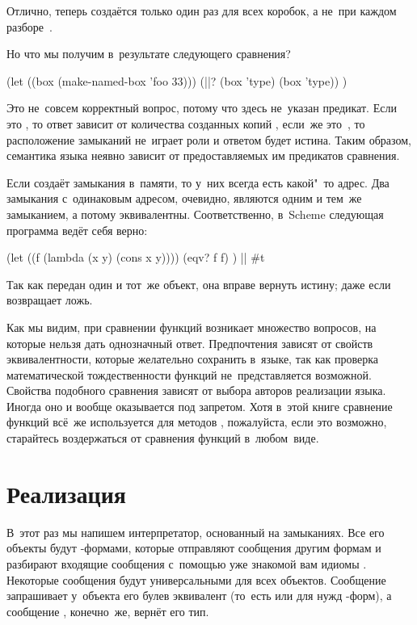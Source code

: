 \noindent
Отлично,  теперь создаётся только один раз для всех коробок, а
не~при каждом разборе~.

Но что мы получим в~результате следующего сравнения?

\begin{code:lisp}
(let ((box (make-named-box 'foo 33)))
  (||? (box 'type) (box 'type)) )
\end{code:lisp}

Это не~совсем корректный вопрос, потому что здесь не~указан предикат. Если это
, то ответ зависит от количества созданных копий , если~же это~, то расположение замыканий не~играет роли и
ответом будет истина. Таким образом, семантика языка неявно зависит от
предоставляемых им предикатов сравнения.

Если  создаёт замыкания в~памяти, то у~них всегда есть какой"~то
адрес. Два замыкания с~одинаковым адресом, очевидно, являются одним и тем~же
замыканием, а потому эквивалентны. Соответственно, в~Scheme следующая программа
ведёт себя верно:

\begin{code:lisp}
(let ((f (lambda (x y) (cons x y))))
  (eqv? f f) ) |\is| #t
\end{code:lisp}

\noindent
Так как  передан один и тот~же объект, она вправе вернуть истину; даже
если  возвращает ложь.

\bigskip

Как мы видим, при сравнении функций возникает множество вопросов, на которые
нельзя дать однозначный ответ. Предпочтения зависят от свойств эквивалентности,
которые желательно сохранить в~языке, так как проверка математической
тождественности функций не~представляется возможной. Свойства подобного
сравнения зависят от выбора авторов реализации языка. Иногда оно и вообще
оказывается под запретом. Хотя в~этой книге сравнение функций всё~же
используется для методов {\Meroonet} ,
пожалуйста, если это возможно, старайтесь воздержаться от сравнения функций
в~любом~виде.


\section{Реализация}\label{assignment/sect:implementation}

В~этот раз мы напишем интерпретатор, основанный на замыканиях. Все его объекты
будут -формами, которые отправляют сообщения другим формам и
разбирают входящие сообщения с~помощью уже знакомой вам идиомы . Некоторые сообщения будут универсальными для всех объектов.
Сообщение  запрашивает у~объекта его булев эквивалент (то~есть
 или  для нужд -форм), а сообщение , конечно~же,
вернёт его тип.

